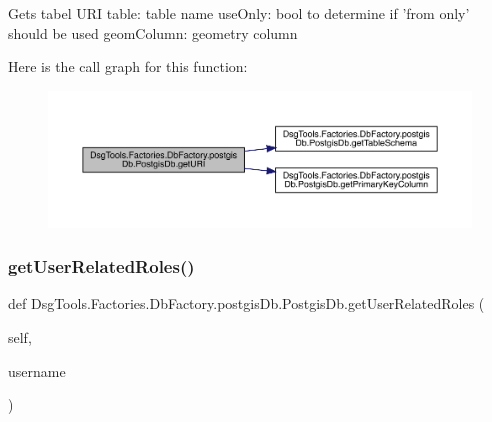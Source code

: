 \begin{DoxyVerb}Gets tabel URI
table: table name
useOnly: bool to determine if 'from only' should be used
geomColumn: geometry column
\end{DoxyVerb}
 Here is the call graph for this function\+:
\nopagebreak
\begin{figure}[H]
\begin{center}
\leavevmode
\includegraphics[width=350pt]{class_dsg_tools_1_1_factories_1_1_db_factory_1_1postgis_db_1_1_postgis_db_ac63b43fecaed6ce997f17389c520174c_cgraph}
\end{center}
\end{figure}
\mbox{\label{class_dsg_tools_1_1_factories_1_1_db_factory_1_1postgis_db_1_1_postgis_db_a1f4aff5bd853804b38968bdb6ad64063}} 
\subsubsection{\texorpdfstring{get\+User\+Related\+Roles()}{getUserRelatedRoles()}}
{\footnotesize\ttfamily def Dsg\+Tools.\+Factories.\+Db\+Factory.\+postgis\+Db.\+Postgis\+Db.\+get\+User\+Related\+Roles (\begin{DoxyParamCaption}\item[{}]{self,  }\item[{}]{username }\end{DoxyParamCaption})}

